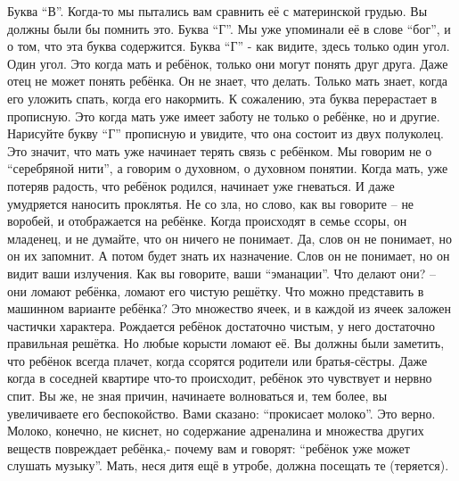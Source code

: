   Буква ``В''. Когда-то мы пытались вам сравнить её с материнской грудью. Вы должны были бы помнить это.
  Буква ``Г''. Мы уже упоминали её в слове ``бог'', и о том, что эта буква содержится. Буква ``Г'' - как видите, здесь только один угол. Один угол. Это когда мать и ребёнок, только они могут понять друг друга. Даже отец не может понять ребёнка. Он не знает, что делать. Только мать знает, когда его уложить спать, когда его накормить. К сожалению, эта буква перерастает в прописную. Это когда мать уже имеет заботу не только о ребёнке, но и другие. Нарисуйте букву ``Г'' прописную и увидите, что она состоит из двух полуколец. Это значит, что мать уже начинает терять связь с ребёнком. Мы говорим не о ``серебряной нити'', а говорим о духовном, о духовном понятии. Когда мать, уже потеряв радость, что ребёнок  родился, начинает уже гневаться. И даже умудряется наносить проклятья. Не со зла, но слово, как вы говорите – не воробей, и отображается на ребёнке. Когда происходят в семье ссоры, он младенец, и не думайте, что он ничего не понимает. Да, слов он не понимает, но он их запомнит. А потом будет знать их назначение. Слов он не понимает, но он видит ваши излучения. Как вы говорите, ваши ``эманации''. Что делают они? – они ломают ребёнка, ломают его чистую решётку. Что можно представить в машинном варианте ребёнка? Это множество ячеек, и в каждой из ячеек заложен частички характера. Рождается ребёнок достаточно чистым, у него достаточно правильная решётка. Но любые корысти ломают её. Вы должны были заметить, что ребёнок всегда плачет, когда ссорятся родители или братья-сёстры. Даже когда в соседней квартире что-то происходит, ребёнок это чувствует и нервно спит. Вы же, не зная причин, начинаете волноваться и, тем более, вы увеличиваете его беспокойство. Вами сказано: ``прокисает молоко''. Это верно. Молоко, конечно, не киснет, но содержание адреналина и множества других веществ повреждает ребёнка,- почему вам и говорят: ``ребёнок уже может слушать музыку''. Мать, неся дитя ещё в утробе, должна посещать те (теряется).
